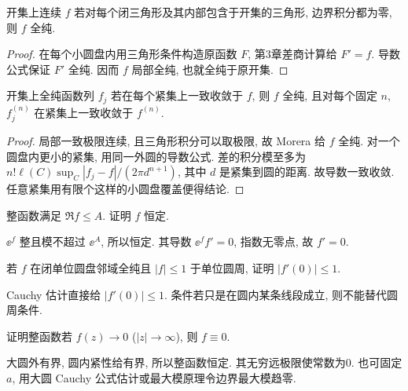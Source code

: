 \begin{theorem}[Morera]\label{thm:morera}
开集上连续 $f$ 若对每个闭三角形及其内部包含于开集的三角形, 边界积分都为零, 则 $f$ 全纯.
\end{theorem}
\begin{proof}
在每个小圆盘内用三角形条件构造原函数 $F$, 第3章差商计算给 $F'=f$. 导数公式保证 $F'$ 全纯. 因而 $f$ 局部全纯, 也就全纯于原开集.
\end{proof}
\begin{theorem}\label{thm:weierstrasslimit}
开集上全纯函数列 $f_j$ 若在每个紧集上一致收敛于 $f$, 则 $f$ 全纯, 且对每个固定 $n$, $f_j^{(n)}$ 在紧集上一致收敛于 $f^{(n)}$.
\end{theorem}
\begin{proof}
局部一致极限连续, 且三角形积分可以取极限, 故 Morera 给 $f$ 全纯. 对一个圆盘内更小的紧集, 用同一外圆的导数公式. 差的积分模至多为 $n!\ell(C)\sup_C|f_j-f|/(2\pi d^{n+1})$, 其中 $d$ 是紧集到圆的距离. 故导数一致收敛. 任意紧集用有限个这样的小圆盘覆盖便得结论.
\end{proof}
\begin{exercise}
整函数满足 $\Re f\le A$. 证明 $f$ 恒定.
\end{exercise}
\begin{solution}
$\ee^f$ 整且模不超过 $\ee^A$, 所以恒定. 其导数 $\ee^f f'=0$, 指数无零点, 故 $f'=0$.
\end{solution}
\begin{exercise}
若 $f$ 在闭单位圆盘邻域全纯且 $|f|\le1$ 于单位圆周, 证明 $|f'(0)|\le1$.
\end{exercise}
\begin{solution}
Cauchy 估计直接给 $|f'(0)|\le1$. 条件若只是在圆内某条线段成立, 则不能替代圆周条件.
\end{solution}
\begin{exercise}
证明整函数若 $f(z)\to0$ ($|z|\to\infty$), 则 $f\equiv0$.
\end{exercise}
\begin{solution}
大圆外有界, 圆内紧性给有界, 所以整函数恒定. 其无穷远极限使常数为0. 也可固定 $a$, 用大圆 Cauchy 公式估计或最大模原理令边界最大模趋零.
\end{solution}
